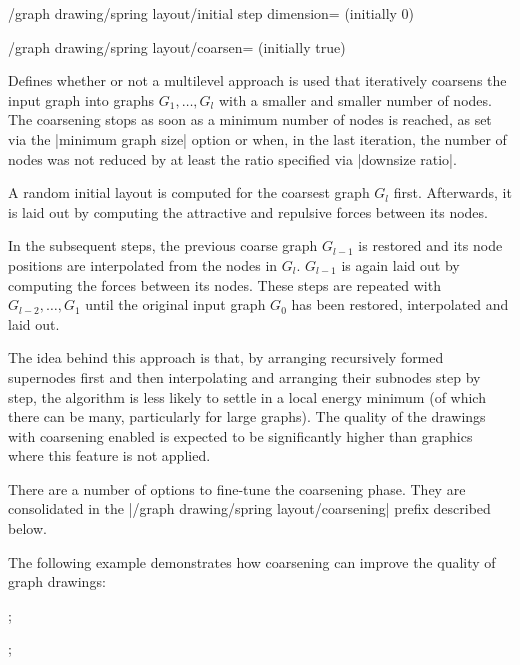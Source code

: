 \begin{key}{/graph drawing/spring layout/initial step 
  dimension= (initially 0)}

\end{key}

\begin{key}{/graph drawing/spring layout/coarsen=
  (initially true)}

  Defines whether or not a multilevel approach is used that
  iteratively coarsens the input graph into graphs $G_1,\dots,G_l$ with 
  a smaller and smaller number of nodes. The coarsening stops as soon as
  a minimum number of nodes is reached, as set via the 
  |minimum graph size| option or when, in the last iteration, the 
  number of nodes was not reduced by at least the ratio specified via 
  |downsize ratio|. 

  A random initial layout is computed for the coarsest graph $G_l$ first.
  Afterwards, it is laid out by computing the attractive and repulsive
  forces between its nodes. 
  
  In the subsequent steps, the previous coarse graph $G_{l-1}$ is 
  restored and its node positions are interpolated from the nodes in 
  $G_l$. $G_{l-1}$ is again laid out by computing the forces between 
  its nodes. These steps are repeated with $G_{l-2},\dots,G_1$ until 
  the original input graph $G_0$ has been restored, interpolated 
  and laid out.

  The idea behind this approach is that, by arranging recursively 
  formed supernodes first and then interpolating and arranging their
  subnodes step by step, the algorithm is less likely to settle in a
  local energy minimum (of which there can be many, particularly for
  large graphs). The quality of the drawings with coarsening enabled is
  expected to be significantly higher than graphics where this feature
  is not applied.

  There are a number of options to fine-tune the coarsening phase.
  They are consolidated in the |/graph drawing/spring layout/coarsening|
  prefix described below.

  The following example demonstrates how coarsening can improve the
  quality of graph drawings:
  \begin{codeexample}[]
\tikz {};

\tikz {};
  \end{codeexample}
\end{key}

